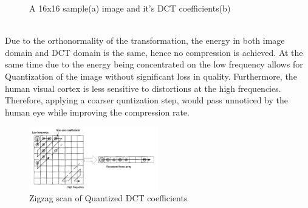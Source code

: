 \documentclass[a4paper,11pt,oneside]{article}
\begin{document}
\begin{figure}[h]
    \centering
    \qquad
    \caption{A 16x16 sample(a) image and it's DCT coefficients(b) \cite[p.~35]{richardson2002video}}
    \label{figure:DCTexample}
\end{figure} \\
\indent Due to the orthonormality of the transformation, the energy in both image domain and DCT domain is the same, hence no compression is achieved. At the same time due to the energy being concentrated on the low frequency allows for Quantization of the image without significant loss in quality. Furthermore, the human visual cortex is less sensitive to distortions at the high frequencies. Therefore, applying a coarser quntization step, would pass unnoticed by the human eye while improving the compression rate. \\
\begin{figure}
    \includegraphics[width=0.5\textwidth]{../figures/zigzag_reorder_QDCT.pdf}
    \caption{Zigzag scan of Quantized DCT coefficients}
    \label{figure:zigzag_scan}
\end{figure}
\end{document}
